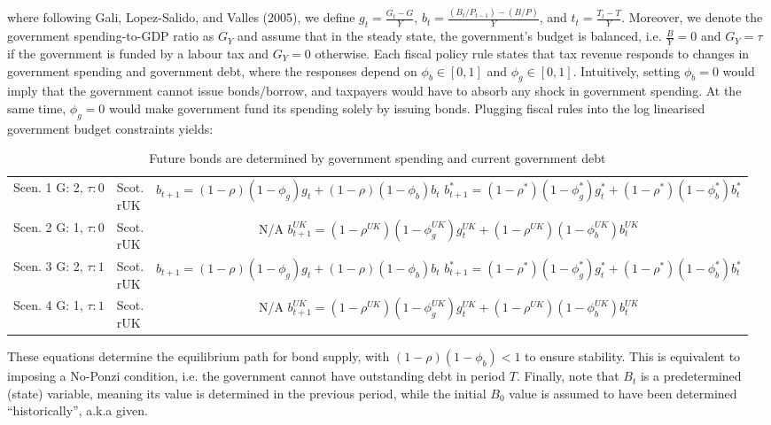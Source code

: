 where following Gali, Lopez-Salido, and Valles (2005), we define $g_t = \frac{G_t-G}{Y}$, $b_t = \frac{(B_t/P_{t-1}) - (B/P)}{Y}$, and $t_t = \frac{T_t - T}{Y}$. Moreover, we denote the government spending-to-GDP ratio as $G_Y$ and assume that in the steady state, the government's budget is balanced, i.e. $\frac{B}{Y} = 0$ and $G_Y = \tau$ if the government is funded by a labour tax and $G_Y=0$ otherwise. Each fiscal policy rule states that tax revenue responds to changes in government spending and government debt, where the responses depend on $\phi_b \in [0,1]$ and $\phi_g \in [0,1]$. Intuitively, setting $\phi_b = 0$ would imply that the government cannot issue bonds/borrow, and taxpayers would have to absorb any shock in government spending. At the same time, $\phi_g = 0$ would make government fund its spending solely by issuing bonds. Plugging fiscal rules into the log linearised government budget constraints yields:
\begin{table}[H]
    \renewcommand{\arraystretch}{2}
    \centering
    \begin{tabular}{l|l|c}
    \makecell{Scen. 1 \\ G: 2, $\tau: 0$} & \makecell{Scot. \\ rUK } & 
        \makecell{
            $b_{t+1} = (1-\rho)(1-\phi_g) g_t + (1-\rho)(1-\phi_b)b_t$\\
            $b^*_{t+1} = (1-\rho^*)(1-\phi^*_g) g^*_t + (1-\rho^*)(1-\phi^*_b)b^*_t$
        }  \\ 
    \makecell{Scen. 2 \\ G: 1, $\tau: 0$} & \makecell{Scot. \\ rUK } & 
        \makecell{
            N/A\\
            $b^{UK}_{t+1} = (1-\rho^{UK})(1-\phi^{UK}_g) g^{UK}_t + (1-\rho^{UK})(1-\phi^{UK}_b)b^{UK}_t$
        }   \\ 
    \makecell{Scen. 3 \\ G: 2, $\tau: 1$} & \makecell{Scot. \\ rUK } & 
    \makecell{
        $b_{t+1} = (1-\rho)(1-\phi_g) g_t + (1-\rho)(1-\phi_b)b_t$\\
        $b^*_{t+1} = (1-\rho^*)(1-\phi^*_g) g^*_t + (1-\rho^*)(1-\phi^*_b)b^*_t$
}  \\
    \makecell{Scen. 4 \\ G: 1, $\tau: 1$} & \makecell{Scot. \\ rUK } & 
    \makecell{
        N/A\\
        $b^{UK}_{t+1} = (1-\rho^{UK})(1-\phi^{UK}_g) g^{UK}_t + (1-\rho^{UK})(1-\phi^{UK}_b)b^{UK}_t$
}  
    \end{tabular}
    \caption{Future bonds are determined by government spending and current government debt}
\end{table}
These equations determine the equilibrium path for bond supply, with \linebreak $(1-\rho)(1-\phi_b) < 1$ to ensure stability. This is equivalent to imposing a No-Ponzi condition, i.e. the government cannot have outstanding debt in period $T$. Finally, note that $B_t$ is a predetermined (state) variable, meaning its value is determined in the previous period, while the initial $B_0$ value is assumed to have been determined ``historically'', a.k.a given.